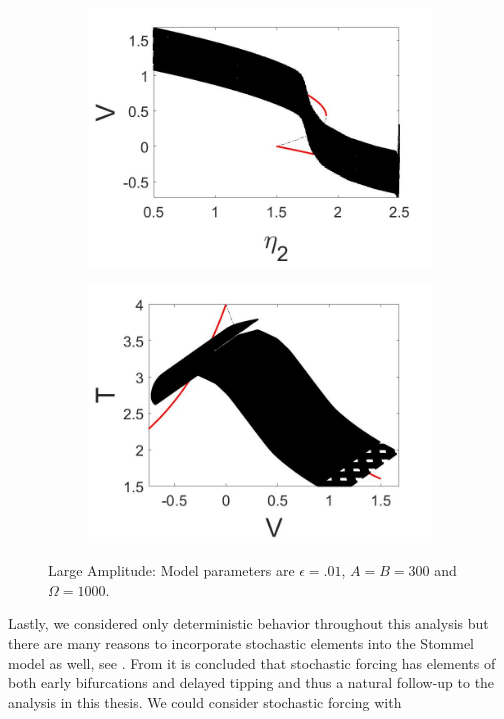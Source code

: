 \begin{figure}[H]
\centering
\begin{subfigure}{.5\textwidth}
 \centering
 \includegraphics[width=\linewidth]{conclusion/large_amp_V.jpg}
 \caption{}
\end{subfigure}%
\begin{subfigure}{.5\textwidth}
 \centering
 \includegraphics[width=\linewidth]{conclusion/large_amp_T.jpg}
 \caption{}
\end{subfigure}
\caption{Large Amplitude: Model parameters are $\epsilon=.01$, $A=B=300$ and $\Omega=1000$.}
\label{fig:large_amp}
\end{figure}

Lastly, we considered only deterministic behavior throughout this analysis but there are many reasons to incorporate stochastic elements into the Stommel model as well, see \cite{lorenzo2012role}. From \cite{zhu2015tipping} it is concluded that stochastic forcing has elements of both early bifurcations and delayed tipping and thus a natural follow-up to the analysis in this thesis. We could consider stochastic forcing with

